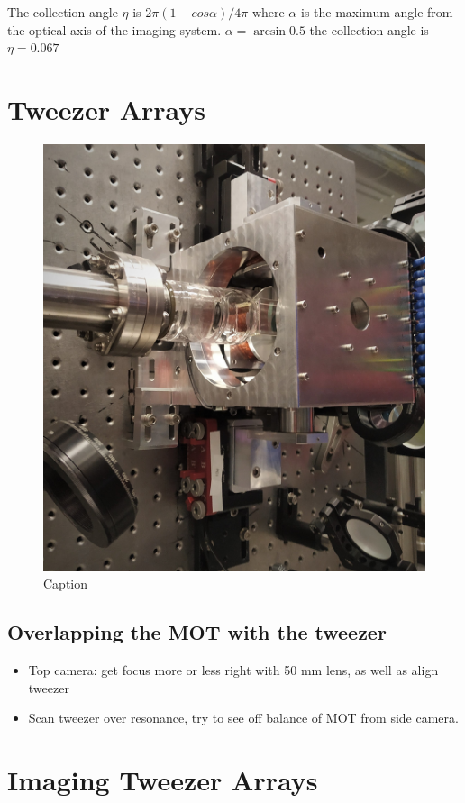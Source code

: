 The collection angle $\eta$ is $2\pi(1-cos{\alpha})/4\pi$ where $\alpha$ is the maximum angle from the optical axis of the imaging system. $\alpha=\arcsin{0.5}$ the collection angle is $\eta = 0.067$

\section{Tweezer Arrays}\label{sec:Tweezers}

\begin{figure}
    \centering
    \includegraphics{figures/Coils.jpg}
    \caption{Caption}
    \label{fig:my_label}
\end{figure}

\subsection{Overlapping the MOT with the tweezer}

\begin{itemize}
    \item Top camera: get focus more or less right with 50 mm lens, as well as align tweezer
    \item Scan tweezer over resonance, try to see off balance of MOT from side camera. 
\end{itemize}

\section{Imaging Tweezer Arrays}\label{sec:TweezerImaging}



